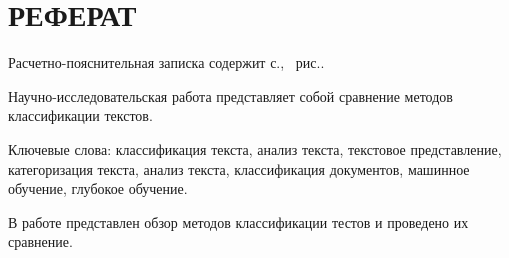 \section*{РЕФЕРАТ}
Расчетно-пояснительная записка содержит \pageref{LastPage} с., \totalfigures\ рис..%

Научно-исследовательская работа представляет собой сравнение методов классификации текстов.

Ключевые слова: классификация текста, анализ текста, текстовое представление, категоризация текста, анализ текста, классификация документов, машинное обучение, глубокое обучение.

В работе представлен обзор методов классификации тестов и проведено их сравнение.
\pagebreak